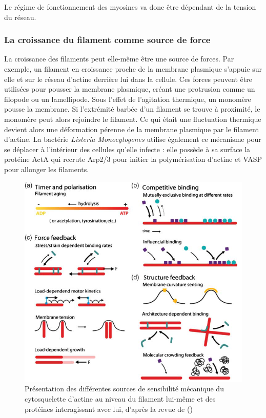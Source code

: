 Le régime de fonctionnement des myosines va donc être dépendant de la tension du réseau. 

\subsubsection{La croissance du filament comme source de force}

La croissance des filaments peut elle-même être une source de forces. Par exemple, un filament en croissance proche de la membrane plasmique s'appuie sur elle et sur le réseau d'actine derrière lui dans la cellule. 
Ces forces peuvent être utilisées pour pousser la membrane plasmique, créant une protrusion comme un filopode ou un lamellipode. Sous l'effet de l'agitation thermique, un monomère pousse la membrane. Si l'extrémité barbée d'un filament se trouve à proximité, le monomère peut alors rejoindre le filament. Ce qui était une fluctuation thermique devient alors une déformation pérenne de la membrane plasmique par le filament d'actine. 
La bactérie \textit{Listeria Monocytogenes} utilise également ce mécanisme pour se déplacer à l'intérieur des cellules qu'elle infecte : elle possède à sa surface la protéine ActA qui recrute Arp2/3 pour initier la polymérisation d'actine et VASP pour allonger les filaments. 


\begin{figure}[h!]
\includegraphics[scale=0.7]{Actine_phenomenon.png}
\caption{Présentation des différentes sources de sensibilité mécanique du cytosquelette d'actine au niveau du filament lui-même et des protéines interagissant avec lui, d'après la revue de (\cite{huber_emergent_2013})}
\end{figure}



